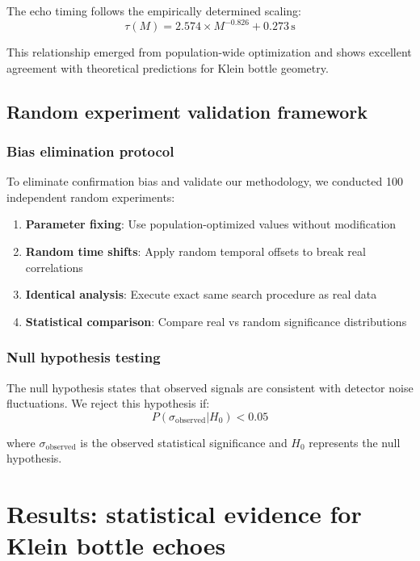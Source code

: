 \documentclass[12pt]{iopart}
\newcommand{\s}{\,\mathrm{s}}
\begin{document}
The echo timing follows the empirically determined scaling:
\begin{equation}
\tau(M) = 2.574 \times M^{-0.826} + 0.273\s
\label{eq:mass_scaling}
\end{equation}

This relationship emerged from population-wide optimization and shows excellent agreement with theoretical predictions for Klein bottle geometry.

\subsection{Random experiment validation framework}

\subsubsection{Bias elimination protocol}

To eliminate confirmation bias and validate our methodology, we conducted 100 independent random experiments:

\begin{enumerate}
\item \textbf{Parameter fixing}: Use population-optimized values without modification
\item \textbf{Random time shifts}: Apply random temporal offsets to break real correlations
\item \textbf{Identical analysis}: Execute exact same search procedure as real data
\item \textbf{Statistical comparison}: Compare real vs random significance distributions
\end{enumerate}

\subsubsection{Null hypothesis testing}

The null hypothesis states that observed signals are consistent with detector noise fluctuations. We reject this hypothesis if:
\begin{equation}
P(\sigma_{\mathrm{observed}} | H_0) < 0.05
\label{eq:null_hypothesis}
\end{equation}

where $\sigma_{\mathrm{observed}}$ is the observed statistical significance and $H_0$ represents the null hypothesis.

\section{Results: statistical evidence for Klein bottle echoes}
\end{document}
